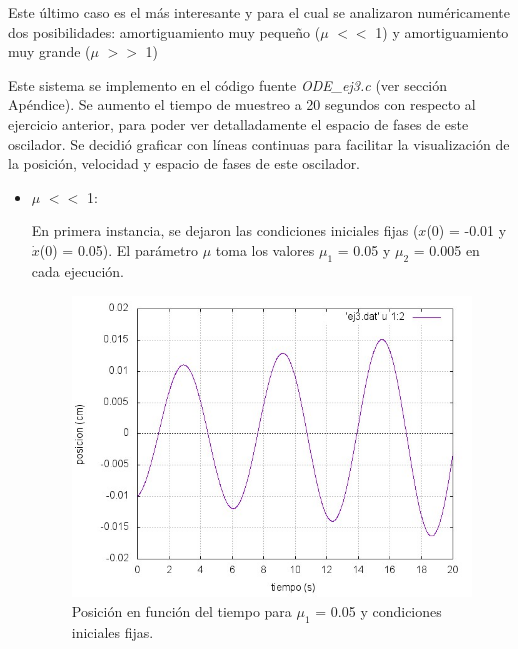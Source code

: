 \documentclass[a4paper,12pt]{article}
\begin{document}
Este \'ultimo caso es el m\'as interesante y para el cual se analizaron num\'ericamente dos posibilidades: amortiguamiento muy peque\~no ($\mu$ $<<$ 1) y amortiguamiento muy grande ($\mu$ $>>$ 1)

Este sistema se implemento en el c\'odigo fuente \textit{ODE\_ej3.c} (ver secci\'on Ap\'endice). Se aumento el tiempo de muestreo a 20 segundos con respecto al ejercicio anterior, para poder ver detalladamente el espacio de fases de este oscilador.
Se decidi\'o graficar con l\'ineas continuas para facilitar la visualizaci\'on de la posici\'on, velocidad y espacio de fases de este oscilador.

\begin{itemize}
\item $\mu$ $<<$ 1:


En primera instancia, se dejaron las condiciones iniciales fijas ($x$(0) = -0.01 y $\dot{x}$(0) = 0.05). El par\'ametro $\mu$ toma los valores $\mu_1$ = 0.05 y $\mu_2$ = 0.005 en cada ejecuci\'on. 

\begin{figure}[H]
\begin{center}
\includegraphics[height=8cm]{grafico_ej3_xVSt.jpg}
\caption[width=5cm]{Posici\'on en funci\'on del tiempo para $\mu_1$ = 0.05 y condiciones iniciales fijas.}
\end{center}
\end{figure}


\end{itemize}
\end{document}
